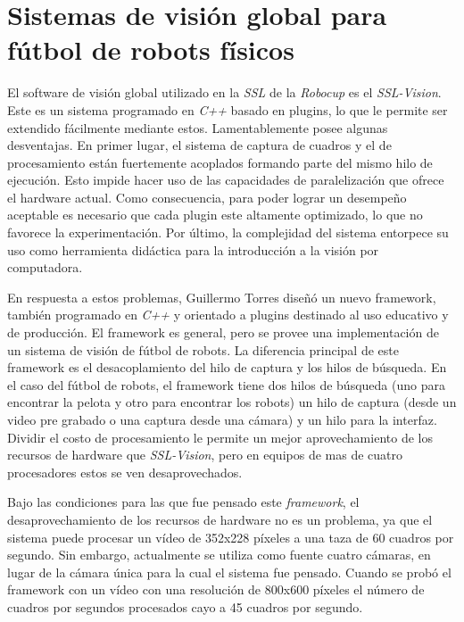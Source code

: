 
\section{Sistemas de visión global para fútbol de robots físicos}


El software de visión global utilizado en la \emph{SSL} de la \emph{Robocup} es
el \emph{SSL-Vision}\cite{sslvision}. Este es un sistema programado en
\emph{C++} basado en plugins, lo que le permite ser extendido fácilmente
mediante estos. Lamentablemente posee algunas desventajas. En primer lugar, el
sistema de captura de cuadros y el de procesamiento están fuertemente
acoplados formando parte del mismo hilo de ejecución. Esto impide hacer uso de
las capacidades de paralelización que ofrece el hardware actual. Como
consecuencia, para poder lograr un desempeño aceptable es necesario que cada
plugin este altamente optimizado, lo que no favorece la experimentación. Por
último, la complejidad del sistema entorpece su uso como herramienta didáctica
para la introducción a la visión por computadora.

En respuesta a estos problemas, Guillermo Torres\cite{torres2014} diseñó un
nuevo framework, también programado en \emph{C++} y orientado a plugins
destinado al uso educativo y de producción. El framework es general, pero se
provee una implementación de un sistema de visión de fútbol de robots. La
diferencia principal de este framework es el desacoplamiento del hilo de captura
y los hilos de búsqueda. En el caso del fútbol de robots, el framework tiene dos
hilos de búsqueda (uno para encontrar la pelota y otro para encontrar los
robots) un hilo de captura (desde un video pre grabado o una captura desde una
cámara) y un hilo para la interfaz. Dividir el costo de procesamiento le permite
un mejor aprovechamiento de los recursos de hardware que \emph{SSL-Vision}, pero
en equipos de mas de cuatro procesadores estos se ven desaprovechados.

Bajo las condiciones para las que fue pensado este \emph{framework}, el
desaprovechamiento de los recursos de hardware no es un problema, ya que el
sistema puede procesar un vídeo de 352x228 píxeles a una taza de 60 cuadros por
segundo. Sin embargo, actualmente se utiliza como fuente cuatro cámaras, en
lugar de la cámara única para la cual el sistema fue pensado. Cuando se probó el
framework con un vídeo con una resolución de 800x600 píxeles el número de
cuadros por segundos procesados cayo a 45 cuadros por segundo.

